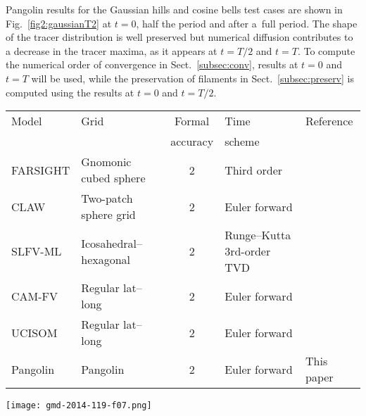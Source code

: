    Pangolin results for the Gaussian hills and cosine bells test cases
   are shown in Fig.~\ref{fig2:gaussianT2} at $t=0$, half the period
   and after a~full period.  The shape of the tracer distribution
   is well preserved but numerical diffusion contributes to a decrease in
   the tracer maxima, as it appears at $t=T/2$ and $t=T$. To compute the
   numerical order of convergence in Sect.~\ref{subsec:conv}, results at $t=0$ and
   $t=T$ will be used, while the preservation of filaments in
   Sect.~\ref{subsec:preserv} is computed using the results at $t=0$
   and $t=T/2$.
\begin{table*}[t]
  \caption{Summary of the models used as a~comparison: name, implementation
  grid, the total number of cells vs. Pangolin, and the time scheme.}
{\begin{tabular}{llcll}
    \toprule
    Model & Grid & Formal  & Time & Reference \\
     &  &  accuracy &  scheme &  \\
    \midrule
    FARSIGHT    & Gnomonic cubed sphere &  2 & Third order & \citet{White2011} \\
    CLAW        & Two-patch sphere grid &  2 & Euler forward &
    \citet{LeVeque2002} \\
    SLFV-ML     & Icosahedral--hexagonal &  2 & Runge--Kutta 3rd-order TVD &
    \citet{Miura2007} \\
    CAM-FV      & Regular lat--long       &  2 & Euler forward & \citet{Collins2004}\\
    UCISOM      & Regular lat--long       &  2 & Euler forward & \citet{Prather1986} \\
    Pangolin    & Pangolin              &  2 & Euler forward & This paper \\
    \bottomrule
  \end{tabular}}
\label{table:models}
\end{table*}



\begin{figure*}[t]
  \centering
\texttt{[image: gmd-2014-119-f07.png]}
\caption{Cosine bells and Gaussian hills results for $t=0$, $t=T/2$, $t=T$
    (top to bottom) with Pangolin. The initial distribution is first deformed
    into filaments and then advected back to its initial position. The Equator
    resolution is $0.56{\degre}\times0.37\degre$.  For these plots, Pangolin data
    are interpolated to a~regular latitude--longitude grid.}
\label{fig2:gaussianT2}
\end{figure*}




